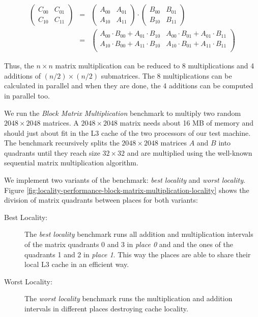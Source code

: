 \begin{eqnarray*}
  \begin{pmatrix}
    C_{00} & C_{01} \\
    C_{10} & C_{11}
  \end{pmatrix}
  &
  =
  &
  \begin{pmatrix}
    A_{00} & A_{01} \\
    A_{10} & A_{11}
  \end{pmatrix}
  \cdot
  \begin{pmatrix}
    B_{00} & B_{01} \\
    B_{10} & B_{11}
  \end{pmatrix}
  \\
  &
  =
  &
  \begin{pmatrix}
    A_{00} \cdot B_{00} + A_{01} \cdot B_{10} & A_{00} \cdot B_{01} + A_{01} \cdot B_{11} \\
    A_{10} \cdot B_{00} + A_{11} \cdot B_{10} & A_{10} \cdot B_{01} + A_{11} \cdot B_{11} \\
  \end{pmatrix}
\end{eqnarray*}

Thus, the $n \times n$ matrix multiplication can be reduced to 8
multiplications and 4 additions of $(n/2) \times (n/2)$
submatrices. The 8 multiplications can be calculated in parallel and
when they are done, the 4 additions can be computed in parallel too.

We run the \emph{Block Matrix Multiplication} benchmark to multiply
two random $2048 \times 2048$ matrices. A $2048 \times 2048$ matrix
needs about 16 MB of memory and should just about fit in the L3 cache
of the two processors of our test machine. The benchmark recursively
splits the $2048 \times 2048$ matrices $A$ and $B$ into quadrants
until they reach size $32 \times 32$ and are multiplied using the
well-known sequential matrix multiplication algorithm.

We implement two variants of the benchmark: \emph{best locality} and
\emph{worst locality}. Figure
\ref{fig:locality-performance-block-matrix-multiplication-locality}
shows the division of matrix quadrants between places for both
variants:

\begin{description}
\item[Best Locality:] The \emph{best locality} benchmark runs all
  addition and multiplication intervals of the matrix quadrants 0 and
  3 in \emph{place 0} and and the ones of the quadrants 1 and 2 in
  \emph{place 1}. This way the places are able to share their local L3
  cache in an efficient way.
\item[Worst Locality:] The \emph{worst locality} benchmark runs the
  multiplication and addition intervals in different places destroying
  cache locality.
\end{description}

